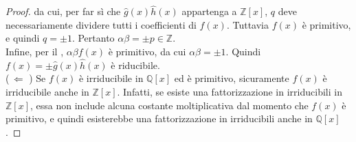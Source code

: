 \documentclass[a4paper]{article}
\newcommand{\ZZ}{\mathbb{Z}}
\newcommand{\QQx}{\mathbb{Q}[x]}
\newcommand{\ZZx}{\mathbb{Z}[x]}
\theoremstyle{definition}
\begin{document}
\begin{proof}
    da cui, per far sì che $\hat{g}(x) \hat{h}(x)$ appartenga
    a $\ZZx$, $q$ deve necessariamente dividere tutti i
    coefficienti di $f(x)$. Tuttavia $f(x)$ è primitivo, e quindi
    $q=\pm 1$. Pertanto $\alpha \beta = \pm p \in \ZZ$. \\

    Infine, per il , $\alpha \beta f(x)$
    è primitivo, da cui $\alpha \beta = \pm 1$. Quindi
    $f(x) = \pm \hat{g}(x) \hat{h}(x)$ è riducibile. \\

    ($\,\Longleftarrow\,\,$)\; Se $f(x)$ è irriducibile in $\QQx$
    ed è primitivo, sicuramente $f(x)$ è irriducibile anche in
    $\ZZx$. Infatti, se esiste una fattorizzazione in
    irriducibili in $\ZZx$, essa non include alcuna costante
    moltiplicativa dal momento che $f(x)$ è primitivo, e quindi
    esisterebbe una fattorizzazione in irriducibili anche in $\QQx$.
\end{proof}
\end{document}
